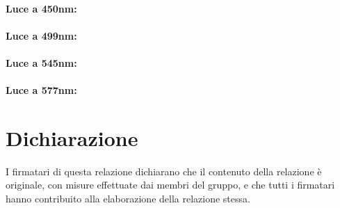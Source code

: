 \documentclass[10pt,a4paper]{article}
\begin{document}
\paragraph{Luce a 450nm:}


\paragraph{Luce a 499nm:}


\paragraph{Luce a 545nm:}


\paragraph{Luce a 577nm:}



\section*{Dichiarazione}

I firmatari di questa relazione dichiarano che il contenuto della relazione \`e originale, con misure effettuate dai membri del gruppo, e che tutti i firmatari hanno contribuito alla elaborazione della relazione stessa.
\end{document}
